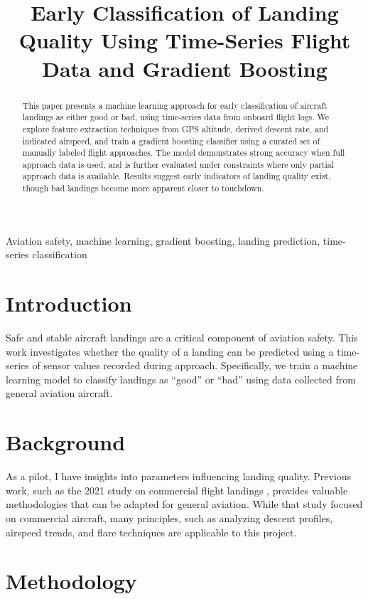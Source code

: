 \documentclass[conference]{IEEEtran}
\title{Early Classification of Landing Quality Using Time-Series Flight Data and Gradient Boosting}
\author{\IEEEauthorblockN{Nathan Johnson}
\IEEEauthorblockA{\textit{Embry-Riddle Aeronautical University} \\
Prescott, Arizona, USA \\
nathan.johnson@erau.edu}}
\begin{document}
\maketitle

\begin{abstract}
This paper presents a machine learning approach for early classification of aircraft landings as either good or bad, using time-series data from onboard flight logs. We explore feature extraction techniques from GPS altitude, derived descent rate, and indicated airspeed, and train a gradient boosting classifier using a curated set of manually labeled flight approaches. The model demonstrates strong accuracy when full approach data is used, and is further evaluated under constraints where only partial approach data is available. Results suggest early indicators of landing quality exist, though bad landings become more apparent closer to touchdown.
\end{abstract}

\begin{IEEEkeywords}
Aviation safety, machine learning, gradient boosting, landing prediction, time-series classification
\end{IEEEkeywords}

\section{Introduction}
Safe and stable aircraft landings are a critical component of aviation safety. This work investigates whether the quality of a landing can be predicted using a time-series of sensor values recorded during approach. Specifically, we train a machine learning model to classify landings as ``good'' or ``bad'' using data collected from general aviation aircraft.

\section{Background}
As a pilot, I have insights into parameters influencing landing quality. Previous work, such as the 2021 study on commercial flight landings \cite{chen2016xgboost}, provides valuable methodologies that can be adapted for general aviation. While that study focused on commercial aircraft, many principles, such as analyzing descent profiles, airspeed trends, and flare techniques are applicable to this project.

\section{Methodology}
\end{document}
